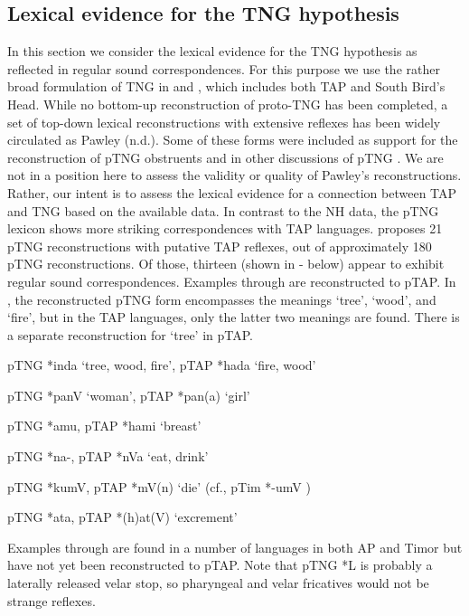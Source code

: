 \subsection{Lexical evidence for the TNG hypothesis}
In this section we consider the lexical evidence for the TNG hypothesis as reflected in regular sound correspondences. For this purpose we use the rather broad formulation of TNG in \citet{Pawley2005} and \citet{Ross2005}, which includes both TAP and South Bird's Head. While no bottom-up reconstruction of proto-TNG has been completed, a set of top-down lexical reconstructions with extensive reflexes has been widely circulated as Pawley (n.d.). Some of these forms were included as support for the reconstruction of pTNG obstruents \citep{Pawley2001} and in other discussions of pTNG \citep{Pawley1998,Pawley2012}. We are not in a position here to assess the validity or quality of Pawley's reconstructions. Rather, our intent is to assess the lexical evidence for a connection between TAP and TNG based on the available data. In contrast to the NH data, the pTNG lexicon shows more striking correspondences with TAP languages. \citet{Pawleynd} proposes 21 pTNG reconstructions with putative TAP reflexes, out of approximately
180 pTNG reconstructions. Of those, thirteen (shown in - below) appear to exhibit regular sound correspondences. Examples  through  are reconstructed to pTAP. In , the reconstructed pTNG form encompasses the meanings `tree', `wood', and `fire', but in the TAP languages, only the latter two meanings are found. There is a separate reconstruction for `tree' in pTAP.

\ea%
\label{ex:4:35}
\upshape   pTNG *inda `tree, wood, fire', pTAP *hada `fire, wood'  
\z

\ea%
\label{ex:4:36}
\upshape   pTNG *panV `woman', pTAP *pan(a) `girl'  
\z

\ea%
\label{ex:4:37}
\upshape pTNG *amu, pTAP *hami `breast'  
\z

\ea%
\label{ex:4:38}
\upshape   pTNG *na-, pTAP *nVa `eat, drink'  
\z

\ea%
\label{ex:4:39}
\upshape   pTNG *kumV, pTAP *mV(n) `die' (cf., pTim *-umV )  
\z

\ea%
\label{ex:4:40}
\upshape   pTNG *ata, pTAP *(h)at(V) `excrement'  
\z

Examples  through  are found in a number of languages in both AP and Timor but have not yet been reconstructed to pTAP. Note that pTNG *L is probably a laterally released velar stop, so pharyngeal and velar fricatives would not be strange reflexes.


